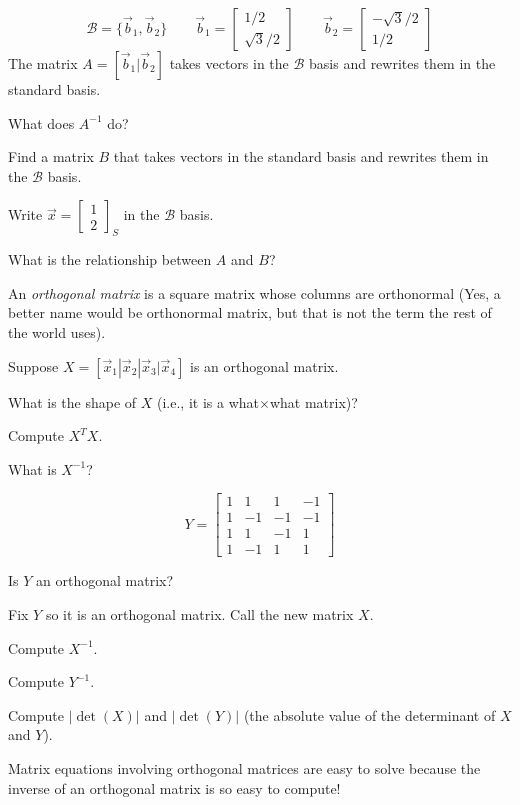 \documentclass{problemset}
\newcommand{\mat}[1]{\begin{bmatrix}#1\end{bmatrix}}
\begin{document}
	\question
	\[
		\mathcal B=\{\vec b_1,\vec b_2\}\qquad\vec b_1=\mat{1/2\\\sqrt{3}/2}
		\qquad \vec b_2=\mat{-\sqrt{3}/2\\1/2}
	\]
	The matrix $A=[\vec b_1|\vec b_2]$ takes vectors in the $\mathcal B$ basis
	and rewrites them in the standard basis.
	\begin{parts}
		\item What does $A^{-1}$ do?
		\item Find a matrix $B$ that takes vectors in the standard basis
			and rewrites them in the $\mathcal B$ basis.
		\item Write $\vec x=\mat{1\\2}_S$ in the $\mathcal B$ basis.
		\item What is the relationship between $A$ and $B$?
	\end{parts}

	\begin{definition}
		An \emph{orthogonal matrix} is a square matrix whose columns are
		orthonormal (Yes, a better name would be orthonormal matrix, but that
		is not the term the rest of the world uses).
	\end{definition}

	\question
	Suppose $X=[\vec x_1|\vec x_2|\vec x_3|\vec x_4]$ is an orthogonal matrix.
	\begin{parts}
		\item What is the shape of $X$ (i.e., it is a what$\times$what matrix)?
		\item Compute $X^TX$.
		\item What is $X^{-1}$?
	\end{parts}

	\question
	\[
		Y=\mat{1&1&1&-1\\1&-1&-1&-1\\1&1&-1&1\\1&-1&1&1}
	\]
	\begin{parts}
		\item Is $Y$ an orthogonal matrix?
		\item Fix $Y$ so it is an orthogonal matrix.  Call the new matrix $X$.
		\item Compute $X^{-1}$.
		\item Compute $Y^{-1}$.
		\item Compute $|\det(X)|$ and $|\det(Y)|$ (the absolute value of
			the determinant of $X$ and $Y$).
	\end{parts}

	Matrix equations involving orthogonal matrices are easy to solve because the
	inverse of an orthogonal matrix is so easy to compute!
	
\end{document}
